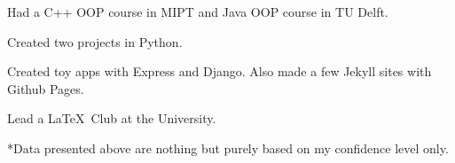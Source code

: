 



\divider\smallskip

Had a C++ OOP course in MIPT and Java OOP course in TU Delft. 

\divider

Created two projects in Python.

\divider

Created toy apps with Express and Django. Also made a few Jekyll sites with Github Pages.

\divider


\divider

Lead a \LaTeX\ Club at the University.

\divider
{\color{gray} *Data presented above are nothing but purely based on my confidence level only. }



